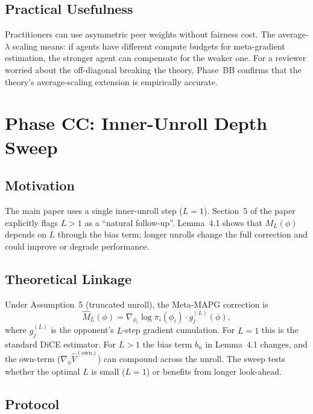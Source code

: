 \documentclass[11pt,a4paper]{article}
\begin{document}
\subsection{Practical Usefulness}

Practitioners can use asymmetric peer weights without fairness cost. The
average-$\lambda$ scaling means: if agents have different compute budgets for
meta-gradient estimation, the stronger agent can compensate for the weaker one.
For a reviewer worried about the off-diagonal breaking the theory, Phase~BB
confirms that the theory's average-scaling extension is empirically accurate.

\section{Phase CC: Inner-Unroll Depth Sweep}
\label{sec:cc}

\subsection{Motivation}

The main paper uses a single inner-unroll step ($L=1$). Section~5 of the paper
explicitly flags $L>1$ as a ``natural follow-up''. Lemma~4.1 shows that
$M_L(\phi)$ depends on $L$ through the bias term; longer unrolls change the
full correction and could improve or degrade performance.

\subsection{Theoretical Linkage}

Under Assumption~5 (truncated unroll), the Meta-MAPG correction is
\[
  \hat{M}_L(\phi) = \nabla_{\phi_i} \log \pi_i(\phi_i) \cdot g_j^{(L)}(\phi),
\]
where $g_j^{(L)}$ is the opponent's $L$-step gradient cumulation. For $L=1$
this is the standard DiCE estimator. For $L>1$ the bias term $b_n$ in
Lemma~4.1 changes, and the own-term ($\nabla_\phi \hat{V}^{(\text{own})}$)
can compound across the unroll. The sweep tests whether the optimal $L$
is small ($L=1$) or benefits from longer look-ahead.

\subsection{Protocol}
\end{document}
